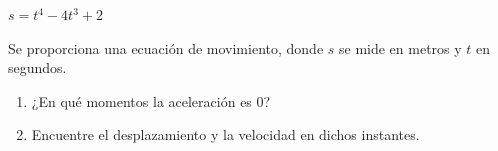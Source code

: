 \setcounter{enumi}{38}
\item $s = t^4 - 4t^3 + 2$
\par
Se proporciona una ecuación de movimiento, donde $s$ se mide en metros y $t$ en segundos.
\begin{enumerate}
    \item[(a)] ¿En qué momentos la aceleración es 0?
    \item[(b)] Encuentre el desplazamiento y la velocidad en dichos instantes.
\end{enumerate}
